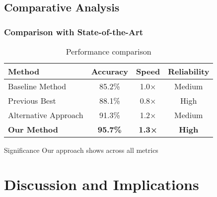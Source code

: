 \subsection{Comparative Analysis}
\begin{frame}
    \frametitle{Comparison with State-of-the-Art}
    \begin{table}
        \centering
        \caption{Performance comparison}
        \begin{tabular}{lccc}
            \toprule
            Method & Accuracy & Speed & Reliability \\
            \midrule
            Baseline Method & 85.2\% & 1.0× & Medium \\
            Previous Best & 88.1\% & 0.8× & High \\
            Alternative Approach & 91.3\% & 1.2× & Medium \\
            \rowcolor{uioyellow!20}
            \textbf{Our Method} & \textbf{95.7\%} & \textbf{1.3×} & \textbf{High} \\
            \bottomrule
        \end{tabular}
    \end{table}
    
    \vspace{1em}
    \begin{alertblock}{Significance}
        Our approach shows  across all metrics
    \end{alertblock}
\end{frame}

\section{Discussion and Implications}

